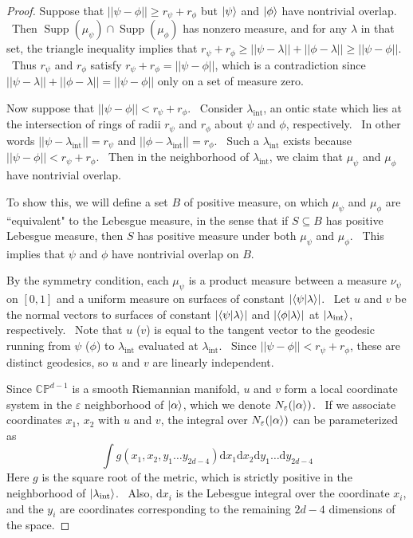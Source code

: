 \documentclass[letterpaper,12pt]{article}
\newcommand{\braket}[2]{\mbox{$ \langle #1 | #2 \rangle $}}
\newcommand{\ket}[1]{\mbox{$ | #1 \rangle $}}
\DeclareMathOperator{\supp}{Supp}
\begin{document}
\begin{proof}
Suppose that $||\psi-\phi||\geq r_{\psi}+r_{\phi}$ but $\ket{\psi}$ and $\ket{\phi}$ have nontrivial overlap. \ Then $\supp(\mu_{\psi})\cap \supp(\mu_{\phi})$ has nonzero measure, and for any $\lambda$ in that set, the triangle inequality implies that $r_{\psi}+r_{\phi}\geq ||\psi-\lambda||+||\phi-\lambda|| \geq ||\psi-\phi||$. \
Thus $r_{\psi}$ and $r_{\phi}$ satisfy $r_{\psi}+r_{\phi} = ||\psi-\phi||$, which is a contradiction since $||\psi-\lambda|| + ||\phi-\lambda|| = ||\psi-\phi||$ only on a set of measure zero. \

Now suppose that $||\psi-\phi||< r_{\psi}+r_{\phi}$. \ Consider $\lambda_{\mathrm{int}}$, an ontic state which lies at the intersection of rings of radii $r_{\psi}$ and $r_{\phi}$ about $\psi$ and $\phi$, respectively. \ In other words $||\psi-\lambda_{\mathrm{int}}|| =r_{\psi} $ and $||\phi-\lambda_{\mathrm{int}}|| =r_{\phi}$. \ Such a $\lambda_{\mathrm{int}}$ exists because $||\psi-\phi||< r_{\psi}+r_{\phi}$. \ Then in the neighborhood of $\lambda_{\mathrm{int}}$, we claim that $\mu_{\psi}$ and $\mu_{\phi}$ have nontrivial overlap.


To show this, we will define a set $B$ of positive measure, on which $\mu_{\psi}$ and $\mu_{\phi}$ are ``equivalent" to the Lebesgue measure, in the sense that if $S\subseteq B$ has positive Lebesgue measure, then $S$ has positive measure under both $\mu_{\psi}$ and $\mu_{\phi}$. \ This implies that $\psi$ and $\phi$ have nontrivial overlap on $B$.

By the symmetry condition, each $\mu_{\psi}$ is a product measure between a measure $\nu_{\psi}$ on $[0,1]$ and a uniform measure on surfaces of constant $|\braket{\psi}{\lambda}|$. \ Let $u$ and $v$ be the normal vectors to surfaces of constant $|\braket{\psi}{\lambda}|$ and $|\braket{\phi}{\lambda}|$ at $\ket{\lambda_{\mathrm{int}}}$, respectively. \ Note that $u$ ($v$) is equal to the tangent vector to the geodesic running from $\psi$ ($\phi$) to $\lambda_{\mathrm{int}}$ evaluated at $\lambda_{\mathrm{int}}$. \ Since $||\psi-\phi||< r_{\psi}+r_{\phi}$, these are distinct geodesics, so $u$ and $v$ are linearly independent.

Since $\mathbb{CP}^{d-1}$ is a smooth Riemannian manifold, $u$ and $v$ form a local coordinate system in the $\varepsilon$ neighborhood of $\ket{\alpha}$, which we denote $N_{\varepsilon}(\ket{\alpha})$. \ If we associate coordinates $x_1$, $x_2$ with $u$ and $v$, the integral over $N_{\varepsilon}(\ket{\alpha})$ can be parameterized as
\[
\int  g(x_1, x_2, y_1 \ldots y_{2d-4}) \mathrm{d} x_1 \mathrm{d}x_2 \mathrm{d}y_1 \ldots \mathrm{d}y_{2d-4}
\]
Here $g$ is the square root of the metric, which is strictly positive in the neighborhood of $\ket{\lambda_{\mathrm{int}}}$. \ Also, $\mathrm{d}x_i$ is the Lebesgue integral over the coordinate $x_i$, and the $y_i$ are coordinates corresponding to the remaining $2d-4$ dimensions of the space.


\end{proof}
\end{document}
